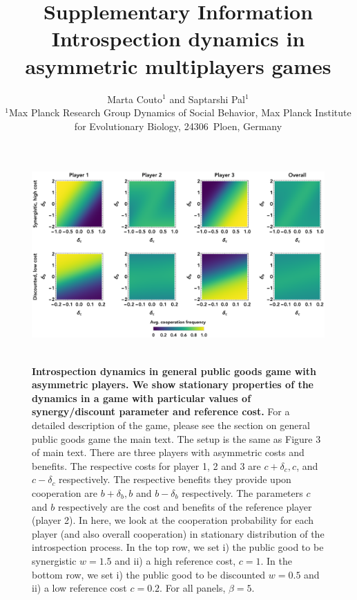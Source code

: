 \documentclass[11pt]{article}
\title{\vspace{0pt} \sffamily \Large Supplementary Information\\[0.1cm] {\bfseries Introspection dynamics in asymmetric multiplayers games}}
\date{\empty}
\author{\parbox[c]{16cm}{\centering \onehalfspacing \fontsize{11}{12}\selectfont Marta Couto$^1$ and Saptarshi Pal$^1$\\[0.2cm]
$^1$Max Planck Research Group Dynamics of Social Behavior, Max Planck Institute for Evolutionary Biology, 24306~Ploen, Germany}}
\theoremstyle{plainCl1}
\theoremstyle{plainCl2}
\begin{document}
\maketitle
\onehalfspacing



\begin{figure}[h!]
\centering
\includegraphics[width =  \textwidth]{figures/Supfigure1.eps}~\\[0.4cm]
\caption{\onehalfspacing
\textbf{Introspection dynamics in general public goods game with asymmetric players. We show stationary properties of the dynamics in a game with particular values of synergy/discount parameter and reference cost.} For a detailed description of the game, please see the section on general public goods game the main text. The setup is the same as Figure 3 of main text. There are three players with asymmetric costs and benefits. The respective costs for player 1, 2 and 3 are $c + \delta_c, c$, and $c - \delta_c$ respectively. The respective benefits they provide upon cooperation are $b + \delta_b, b$ and $b - \delta_b$ respectively. The parameters $c$ and $b$ respectively are the cost and benefits of the reference player (player 2). In here, we look at the cooperation probability for each player (and also overall cooperation) in stationary distribution of the introspection process. In the top row, we set i) the public good to be synergistic $w = 1.5$ and ii) a high reference cost, $c = 1$. In the bottom row, we set i) the public good to be discounted $w = 0.5$ and ii) a low reference cost $c = 0.2$. For all panels, $\beta = 5$.}
 
\label{Fig:Supp-Fig1}
\end{figure}
\clearpage
\end{document}
